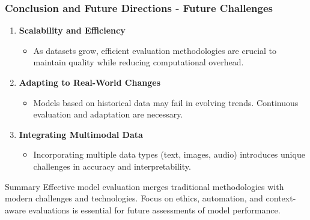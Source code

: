 \documentclass[aspectratio=169]{beamer}
\begin{document}
\begin{frame}[fragile]
    \frametitle{Conclusion and Future Directions - Future Challenges}
    \begin{enumerate}
        \item \textbf{Scalability and Efficiency}
        \begin{itemize}
            \item As datasets grow, efficient evaluation methodologies are crucial to maintain quality while reducing computational overhead.
        \end{itemize}
        
        \item \textbf{Adapting to Real-World Changes}
        \begin{itemize}
            \item Models based on historical data may fail in evolving trends. Continuous evaluation and adaptation are necessary.
        \end{itemize}
        
        \item \textbf{Integrating Multimodal Data}
        \begin{itemize}
            \item Incorporating multiple data types (text, images, audio) introduces unique challenges in accuracy and interpretability.
        \end{itemize}
    \end{enumerate}
    
    \begin{block}{Summary}
        Effective model evaluation merges traditional methodologies with modern challenges and technologies. Focus on ethics, automation, and context-aware evaluations is essential for future assessments of model performance.
    \end{block}
\end{frame}
\end{document}
